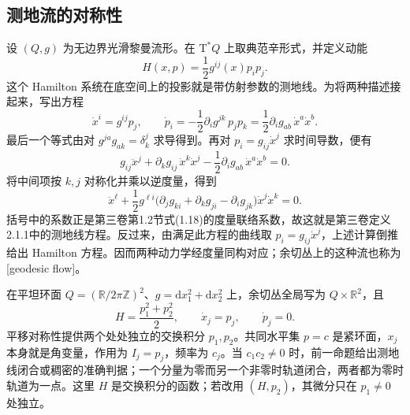 \subsection{测地流的对称性}
\label{g4:subsec:1104:02}
设 \((Q,g)\) 为无边界光滑黎曼流形。在 \(\mathrm{T}^*Q\) 上取典范辛形式，并定义动能
\[
	H(x,p)=\frac12g^{ij}(x)p_ip_j.
\]
这个 Hamilton 系统在底空间上的投影就是带仿射参数的测地线。为将两种描述接起来，写出方程
\[
	\dot x^i=g^{ij}p_j,
	\qquad \dot p_i=-\frac12\partial_i g^{jk}\,p_jp_k
	=\frac12\partial_i g_{ab}\,\dot x^a\dot x^b.
\]
最后一个等式由对 \(g^{ja}g_{ak}=\delta^j_k\) 求导得到。再对 \(p_i=g_{ij}\dot x^j\) 求时间导数，便有
\[
	g_{ij}\ddot x^j+\partial_k g_{ij}\,\dot x^k\dot x^j
	-\frac12\partial_i g_{ab}\,\dot x^a\dot x^b=0.
\]
将中间项按 \(k,j\) 对称化并乘以逆度量，得到
\begin{equation}\label{g4:eq:1104:geodesic-hamilton-equivalence}
	\ddot x^\ell+
	\frac12g^{\ell i}
	\bigl(\partial_jg_{ki}+\partial_kg_{ji}-\partial_ig_{jk}\bigr)
	\dot x^j\dot x^k=0.
\end{equation}
括号中的系数正是第三卷第1.2节式(1.18)的度量联络系数，故这就是第三卷定义2.1.1中的测地线方程。反过来，由满足此方程的曲线取 \(p_i=g_{ij}\dot x^j\)，上述计算倒推给出 Hamilton 方程。因而两种动力学经度量同构对应；余切丛上的这种流也称为[geodesic flow]。

\begin{example}\label{g4:exm:1104:flat-torus}
	在平坦环面 \(Q=(\mathbb R/2\pi\mathbb Z)^2\)、\(g=\mathrm{d}x_1^2+\mathrm{d}x_2^2\) 上，余切丛全局写为 \(Q\times\mathbb R^2\)，且
	\[
		H=\frac{p_1^2+p_2^2}{2},\qquad
		\dot x_j=p_j,\qquad \dot p_j=0.
	\]
	平移对称性提供两个处处独立的交换积分 \(p_1,p_2\)。共同水平集 \(p=c\) 是紧环面，\(x_j\) 本身就是角变量，作用为 \(I_j=p_j\)，频率为 \(c_j\)。当 \(c_1c_2\ne0\) 时，前一命题给出测地线闭合或稠密的准确判据；一个分量为零而另一个非零时轨道闭合，两者都为零时轨道为一点。这里 \(H\) 是交换积分的函数；若改用 \((H,p_2)\)，其微分只在 \(p_1\ne0\) 处独立。
\end{example}

